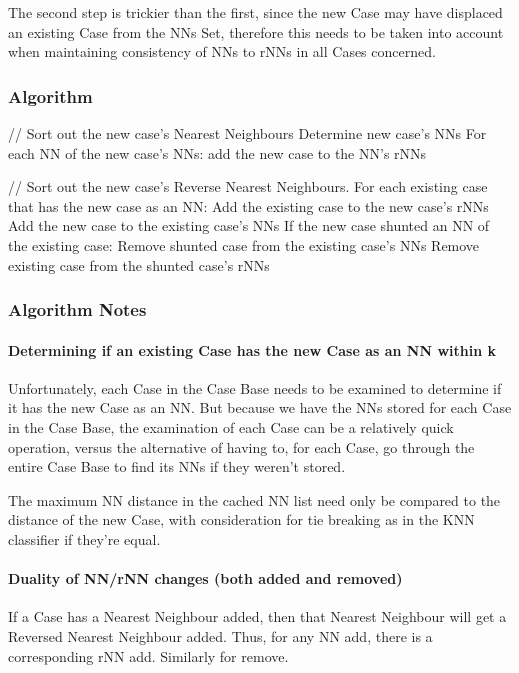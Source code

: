 \documentclass[a4paper,11pt]{report}
\begin{document}
The second step is trickier than the first, since the new Case may have displaced an existing Case from the NNs Set, therefore this needs to be taken into account when maintaining consistency of NNs to rNNs in all Cases concerned.

\subsubsection{Algorithm}
\begin{code}
// Sort out the new case's Nearest Neighbours
Determine new case's NNs
For each NN of the new case's NNs:
  add the new case to the NN's rNNs

// Sort out the new case's Reverse Nearest Neighbours.
For each existing case that has the new case as an NN:
  Add the existing case to the new case's rNNs
  Add the new case to the existing case's NNs
  If the new case shunted an NN of the existing case:
    Remove shunted case from the existing case's NNs
    Remove existing case from the shunted case's rNNs
\end{code}


\subsubsection{Algorithm Notes}
\paragraph{Determining if an existing Case has the new Case as an NN within k}
Unfortunately, each Case in the Case Base needs to be examined to determine if it has the new Case as an NN. But because we have the NNs stored for each Case in the Case Base, the examination of each Case can be a relatively quick operation, versus the alternative of having to, for each Case, go through the entire Case Base to find its NNs if they weren't stored.

The maximum NN distance in the cached NN list need only be compared to the distance of the new Case, with consideration for tie breaking as in the KNN classifier if they're equal.

\paragraph{Duality of NN/rNN changes (both added and removed)}
If a Case has a Nearest Neighbour added, then that Nearest Neighbour will get a Reversed Nearest Neighbour added. Thus, for any NN add, there is a corresponding rNN add. Similarly for remove.
\end{document}
